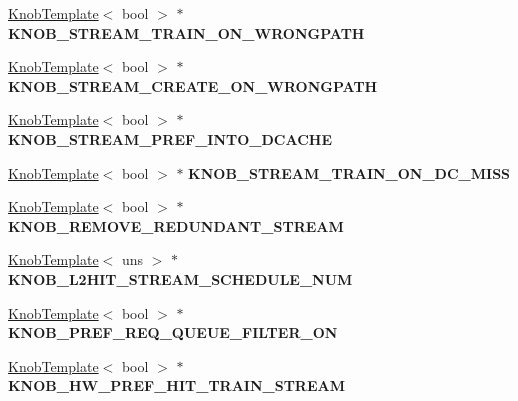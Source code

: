 \begin{DoxyCompactItemize}
\item 
\hypertarget{classall__knobs__c_ab83b7f8909f37db07f2a03c1f682c48c}{
\hyperlink{classKnobTemplate}{KnobTemplate}$<$ bool $>$ $\ast$ {\bfseries KNOB\_\-STREAM\_\-TRAIN\_\-ON\_\-WRONGPATH}}
\label{classall__knobs__c_ab83b7f8909f37db07f2a03c1f682c48c}

\item 
\hypertarget{classall__knobs__c_aede99adb543caa912a9561a035760fbf}{
\hyperlink{classKnobTemplate}{KnobTemplate}$<$ bool $>$ $\ast$ {\bfseries KNOB\_\-STREAM\_\-CREATE\_\-ON\_\-WRONGPATH}}
\label{classall__knobs__c_aede99adb543caa912a9561a035760fbf}

\item 
\hypertarget{classall__knobs__c_a96abf751ae85abc6f378660f7e595ce8}{
\hyperlink{classKnobTemplate}{KnobTemplate}$<$ bool $>$ $\ast$ {\bfseries KNOB\_\-STREAM\_\-PREF\_\-INTO\_\-DCACHE}}
\label{classall__knobs__c_a96abf751ae85abc6f378660f7e595ce8}

\item 
\hypertarget{classall__knobs__c_a3c882122933ea9f9eba02b41daf8080d}{
\hyperlink{classKnobTemplate}{KnobTemplate}$<$ bool $>$ $\ast$ {\bfseries KNOB\_\-STREAM\_\-TRAIN\_\-ON\_\-DC\_\-MISS}}
\label{classall__knobs__c_a3c882122933ea9f9eba02b41daf8080d}

\item 
\hypertarget{classall__knobs__c_af98231a062f7ad246fb0520df60e1055}{
\hyperlink{classKnobTemplate}{KnobTemplate}$<$ bool $>$ $\ast$ {\bfseries KNOB\_\-REMOVE\_\-REDUNDANT\_\-STREAM}}
\label{classall__knobs__c_af98231a062f7ad246fb0520df60e1055}

\item 
\hypertarget{classall__knobs__c_a816d753d124a5c7dbdeaa88c2accda65}{
\hyperlink{classKnobTemplate}{KnobTemplate}$<$ uns $>$ $\ast$ {\bfseries KNOB\_\-L2HIT\_\-STREAM\_\-SCHEDULE\_\-NUM}}
\label{classall__knobs__c_a816d753d124a5c7dbdeaa88c2accda65}

\item 
\hypertarget{classall__knobs__c_ae71d996059ab4a46373a4f5ebc7595e7}{
\hyperlink{classKnobTemplate}{KnobTemplate}$<$ bool $>$ $\ast$ {\bfseries KNOB\_\-PREF\_\-REQ\_\-QUEUE\_\-FILTER\_\-ON}}
\label{classall__knobs__c_ae71d996059ab4a46373a4f5ebc7595e7}

\item 
\hypertarget{classall__knobs__c_ae8f4d20ebd44c4fd2ed9c8dfa17a48c0}{
\hyperlink{classKnobTemplate}{KnobTemplate}$<$ bool $>$ $\ast$ {\bfseries KNOB\_\-HW\_\-PREF\_\-HIT\_\-TRAIN\_\-STREAM}}
\label{classall__knobs__c_ae8f4d20ebd44c4fd2ed9c8dfa17a48c0}


\end{DoxyCompactItemize}
